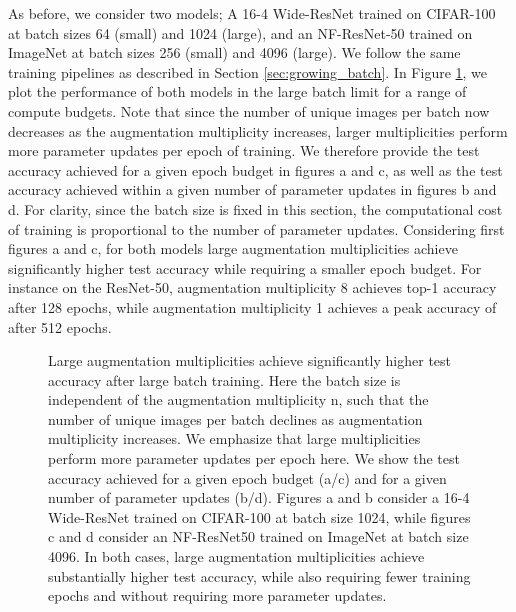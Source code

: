 \documentclass{article}
\begin{document}
As before, we consider two models; A 16-4 Wide-ResNet trained on CIFAR-100 at batch sizes 64 (small) and 1024 (large), and an NF-ResNet-50 \citep{brock2021characterizing} trained on ImageNet at batch sizes 256 (small) and 4096 (large). We follow the same training pipelines as described in Section \ref{sec:growing_batch}.
In Figure \ref{fig:large}, we plot the performance of both models in the large batch limit for a range of compute budgets. Note that since the number of unique images per batch now decreases as the augmentation multiplicity increases, larger multiplicities perform more parameter updates per epoch of training. We therefore provide the test accuracy achieved for a given epoch budget in figures a and c, as well as the test accuracy achieved within a given number of parameter updates in figures b and d. For clarity, since the batch size is fixed in this section, the computational cost of training is proportional to the number of parameter updates. Considering first figures a and c, for both models large augmentation multiplicities achieve significantly higher test accuracy while requiring a smaller epoch budget. For instance on the ResNet-50, augmentation multiplicity 8 achieves  top-1 accuracy after 128 epochs, while augmentation multiplicity 1 achieves a peak accuracy of  after 512 epochs. 

\begin{figure}[t]
\centering
 \vskip -1mm
\vskip -2mm
\caption{Large augmentation multiplicities achieve significantly higher test accuracy after large batch training. Here the batch size is independent of the augmentation multiplicity n, such that the number of unique images per batch declines as augmentation multiplicity increases. We emphasize that large multiplicities perform more parameter updates per epoch here. We show the test accuracy achieved for a given epoch budget (a/c) and for a given number of parameter updates (b/d). Figures a and b consider a 16-4 Wide-ResNet trained on CIFAR-100 at batch size 1024, while figures c and d consider an NF-ResNet50 trained on ImageNet at batch size 4096. In both cases, large augmentation multiplicities achieve substantially higher test accuracy, while also requiring fewer training epochs and without requiring more parameter updates.
}
\label{fig:large}
\vskip -2mm
\end{figure}
\end{document}
